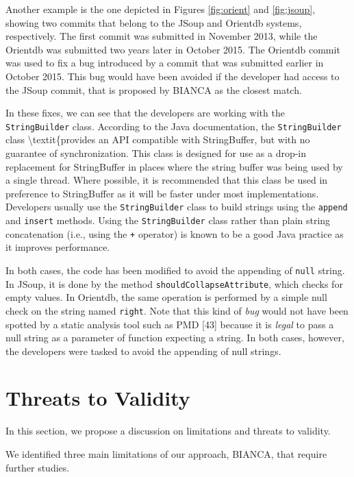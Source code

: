 \documentclass[12pt]{report}
\begin{document}
Another example is the one depicted in Figures \ref{fig:orient} and
\ref{fig:jsoup}, showing two commits that belong to the JSoup and
Orientdb systems, respectively. The first commit was submitted in
November 2013, while the Orientdb was submitted two years later in
October 2015. The Orientdb commit was used to fix a bug introduced by a
commit that was submitted earlier in October 2015. This bug would have
been avoided if the developer had access to the JSoup commit, that is
proposed by BIANCA as the closest match.



In these fixes, we can see that the developers are working with the
\texttt{StringBuilder} class. According to the Java documentation, the
\texttt{StringBuilder} class \textbackslash{}textit\{provides an API
compatible with StringBuffer, but with no guarantee of synchronization.
This class is designed for use as a drop-in replacement for StringBuffer
in places where the string buffer was being used by a single thread.
Where possible, it is recommended that this class be used in preference
to StringBuffer as it will be faster under most implementations.
Developers usually use the \texttt{StringBuilder} class to build strings
using the \texttt{append} and \texttt{insert} methods. Using the
\texttt{StringBuilder} class rather than plain string concatenation
(i.e., using the \texttt{+} operator) is known to be a good Java
practice as it improves performance.

In both cases, the code has been modified to avoid the appending of
\texttt{null} string. In JSoup, it is done by the method
\texttt{shouldCollapseAttribute}, which checks for empty values. In
Orientdb, the same operation is performed by a simple null check on the
string named \texttt{right}. Note that this kind of \textit{bug} would
not have been spotted by a static analysis tool such as PMD {[}43{]}
because it is \textit{legal} to pass a null string as a parameter of
function expecting a string. In both cases, however, the developers were
tasked to avoid the appending of null strings.

\section{Threats to Validity}\label{threats-to-validity-2}

In this section, we propose a discussion on limitations and threats to
validity.

We identified three main limitations of our approach, BIANCA, that
require further studies.
\end{document}
